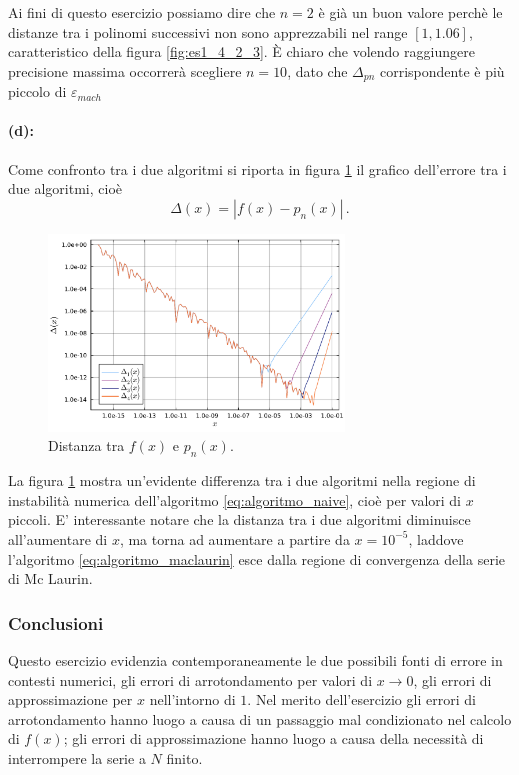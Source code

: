 \documentclass[letterpaper, 12pt]{article}
\numberwithin{equation}{section}    %
\begin{document}
Ai fini di questo esercizio possiamo dire che $n = 2$ è già un buon valore perchè le distanze tra i 
polinomi successivi non sono apprezzabili nel range $[1, 1.06]$, caratteristico della figura \ref{fig:es1_4_2_3}.
È chiaro che volendo raggiungere precisione massima occorrerà scegliere $n = 10$, dato che $\Delta_{pn}$ 
corrispondente è più piccolo di $\varepsilon_{mach}$

\paragraph{(d):}Come confronto tra i due algoritmi si riporta in figura \ref{fig:es1_4_2_5} il grafico 
dell'errore tra i due algoritmi, cioè
\begin{equation}
    \Delta(x) = \left| f(x) - p_n(x) \right|\,.
\end{equation}

\begin{figure}[!ht]
    \centering
    \includegraphics[width=0.7\textwidth]{1425.pdf}
    \caption{Distanza tra $f(x)$ e $p_n(x)$.}
    \label{fig:es1_4_2_5}
\end{figure}

La figura \ref{fig:es1_4_2_5} mostra un'evidente differenza tra i due algoritmi nella regione di instabilità
numerica dell'algoritmo \ref{eq:algoritmo_naive}, cioè per valori di $x$ piccoli. E' interessante notare che 
la distanza tra i due algoritmi diminuisce all'aumentare di $x$, ma torna ad aumentare a partire da
$x = 10^{-5}$, laddove l'algoritmo \ref{eq:algoritmo_maclaurin} esce dalla regione di convergenza della 
serie di Mc Laurin. 
\subsubsection{Conclusioni}
Questo esercizio evidenzia contemporaneamente le due possibili fonti di errore 
in contesti numerici,
gli errori di arrotondamento per valori di $x \rightarrow 0$, gli errori di approssimazione per $x$ nell'intorno
di $1$. 
Nel merito dell'esercizio gli errori di arrotondamento hanno luogo a causa di un passaggio 
mal condizionato nel calcolo di $f(x)$; gli errori di approssimazione hanno luogo a causa della necessità 
di interrompere la serie a $N$ finito.
\end{document}
